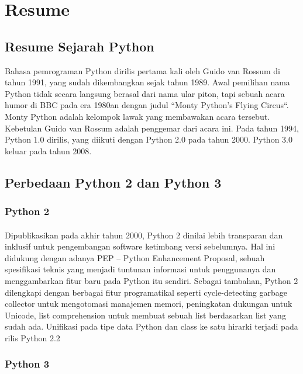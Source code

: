 
\section{Resume}
\subsection{Resume Sejarah Python}
\begin{flushleft}
\qquad Bahasa pemrograman Python dirilis pertama kali oleh Guido van Rossum di tahun 1991, yang sudah dikembangkan sejak tahun 1989. Awal pemilihan nama Python tidak secara langsung berasal dari nama ular piton, tapi sebuah acara humor di BBC pada era 1980an dengan judul “Monty Python’s Flying Circus“. Monty Python adalah kelompok lawak yang membawakan acara tersebut. Kebetulan Guido van Rossum adalah penggemar dari acara ini. Pada tahun 1994, Python 1.0 dirilis, yang diikuti dengan Python 2.0 pada tahun 2000. Python 3.0 keluar pada tahun 2008.
\end{flushleft}
\subsection{Perbedaan Python 2 dan Python 3}
\subsubsection{Python 2}
\paragraph{}
Dipublikasikan pada akhir tahun 2000, Python 2 dinilai lebih transparan dan inklusif untuk pengembangan software ketimbang versi sebelumnya. Hal ini didukung dengan adanya PEP – Python Enhancement Proposal, sebuah spesifikasi teknis yang menjadi tuntunan informasi untuk penggunanya dan menggambarkan fitur baru pada Python itu sendiri. Sebagai tambahan, Python 2 dilengkapi dengan berbagai fitur programatikal seperti cycle-detecting garbage collector untuk mengotomasi manajemen memori, peningkatan dukungan untuk Unicode, list comprehension untuk membuat sebuah list berdasarkan list yang sudah ada. Unifikasi pada tipe data Python dan class ke satu hirarki terjadi pada rilis Python 2.2
\subsubsection{Python 3}
